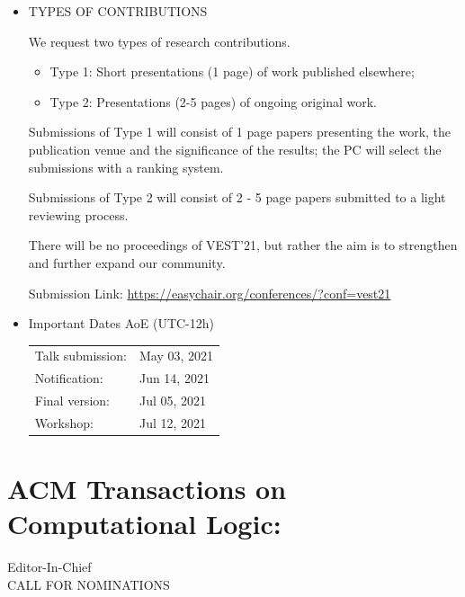 \documentclass[prodmode,acmtecs]{acmsmall} %
\begin{document}
\begin{itemize}
\item  TYPES OF CONTRIBUTIONS 
 
  We request two types of research contributions.  
 
\begin{itemize}\item  Type 1: Short presentations (1 page) of work published elsewhere;
\item  Type 2: Presentations (2-5 pages) of ongoing original work.
\end{itemize} 
  Submissions of Type 1 will consist of 1 page papers presenting the work, the publication venue and the significance of the results; the PC will select the submissions with a ranking system.  
 
  Submissions of Type 2 will consist of 2 - 5 page papers submitted to a light reviewing process. 
 
  There will be no proceedings of VEST'21, but rather the aim is to strengthen and further expand our community. 
 
  Submission Link: \href{https://easychair.org/conferences/?conf=vest21}{https://easychair.org/conferences/?conf=vest21} 
 
\item  Important Dates AoE (UTC-12h) 
 
\begin{tabulary}{\linewidth}{LL}Talk submission:  & May 03, 2021 \\
Notification:  & Jun 14, 2021 \\
Final version:  & Jul 05, 2021 \\
Workshop:  & Jul 12, 2021 \\
\end{tabulary}
 
\end{itemize}\section{ACM Transactions on Computational Logic:}\label{ACMTransactionsonComputationalLogic}  Editor-In-Chief\\ 
CALL FOR NOMINATIONS 
\end{document}
